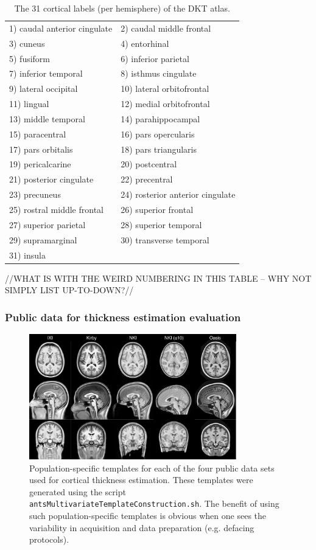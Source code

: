 \begin{table}
\centering
\begin{tabular*}{0.475\textwidth}{@{\extracolsep{\fill}} l l}
\toprule
  1) caudal anterior cingulate & 2) caudal middle frontal \\
  3) cuneus & 4) entorhinal \\
  5) fusiform & 6) inferior parietal \\
  7) inferior temporal & 8) isthmus cingulate \\
  9) lateral occipital & 10) lateral orbitofrontal \\
  11) lingual & 12) medial orbitofrontal \\
  13) middle temporal & 14) parahippocampal \\
  15) paracentral & 16) pars opercularis \\
  17) pars orbitalis & 18) pars triangularis \\
  19) pericalcarine & 20) postcentral \\
  21) posterior cingulate & 22) precentral \\
  23) precuneus & 24) rosterior anterior cingulate \\
  25) rostral middle frontal & 26) superior frontal \\
  27) superior parietal & 28) superior temporal \\
  29) supramarginal & 30) transverse temporal \\
  31) insula & {} \\  
\bottomrule
\end{tabular*}
\caption{The 31 cortical labels (per hemisphere) of the DKT atlas.  }
\label{table:dkt_labels}
\end{table}

//WHAT IS WITH THE WEIRD NUMBERING IN THIS TABLE -- WHY NOT SIMPLY LIST UP-TO-DOWN?//

\subsubsection{Public data for thickness estimation evaluation}

\begin{figure}
  \centering
  \includegraphics[width=90mm]{Figures/templates.pdf}
  \caption{Population-specific templates for each of the four public data sets used
  for cortical thickness 
  estimation. These templates were generated using the script {\tt antsMultivariateTemplateConstruction.sh}.
  The benefit of using such population-specific templates is obvious when one sees the variability in
  acquisition and data preparation (e.g. defacing protocols).
  }
  \label{fig:template}
\end{figure}

